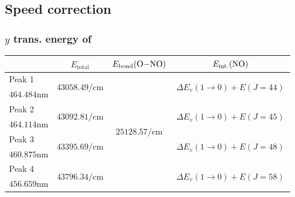 \documentclass[aspectratio=43,scheme=plain]{ctexbeamer}
\begin{document}
	\subsection{Speed correction}
		\subsubsection{$y$ trans. energy of }
	\begin{frame}{\insertsubsection}{\insertsubsubsection}
		\begin{table}[htbp]
			\centering
			\tiny
			\begin{tabularx}{0.9\textwidth}{lccc}
				\toprule
				& $E_\text{total}$ & $E_\text{bond}(\ce{O-NO})$ \footfullcite{ono}& $E_\text{int.}(\ce{NO})$ \\
				\midrule
				Peak 1 & \multirow{2}[2]{*}{$\num{43058.49}\unit{\per \centi \meter}$} & \multirow{8}[8]{*}{$\num{25128.57}\unit{\per \centi \meter}$} & \multirow{2}[2]{*}{\quad\quad\,$\Delta E_v (1\rightarrow 0)+ E( J = 44 )$\quad\quad\,} \\
				$\num{464.484}\unit{\nano\meter}$ & & & \\
				\cmidrule{1-2}\cmidrule{4-4}
				Peak 2 & \multirow{2}[2]{*}{$\num{43092.81}\unit{\per \centi \meter}$} & & \multirow{2}[2]{*}{\quad\quad\,$\Delta E_v (1\rightarrow 0)+ E( J = 45 )$\quad\quad\,} \\
				$\num{464.114}\unit{\nano\meter}$ & & & \\
				\cmidrule{1-2}\cmidrule{4-4}
				Peak 3 & \multirow{2}[2]{*}{$\num{43395.69}\unit{\per \centi \meter}$} & & \multirow{2}[2]{*}{\quad\quad\,$\Delta E_v (1\rightarrow 0)+ E( J = 48 )$\quad\quad\,} \\
				$\num{460.875}\unit{\nano\meter}$ & & & \\
				\cmidrule{1-2}\cmidrule{4-4}
				Peak 4 & \multirow{2}[2]{*}{$\num{43796.34}\unit{\per \centi \meter}$} & & \multirow{2}[2]{*}{\quad\quad\,$\Delta E_v (1\rightarrow 0)+ E( J = 58 )$\quad\quad\,} \\
				$\num{456.659}\unit{\nano\meter}$ & & & \\
				\bottomrule
			\end{tabularx}
		\end{table}
	\end{frame}
\end{document}
